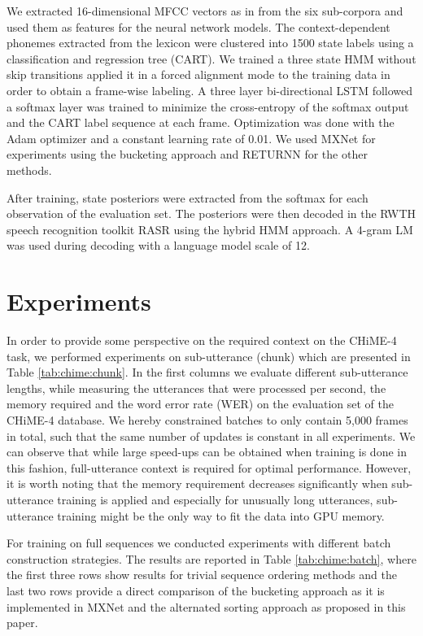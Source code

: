 \documentclass{article}
\begin{document}
  We extracted 16-dimensional MFCC vectors as in \cite{menne16:chime4System} from the six sub-corpora
  and used them as features for the neural network models. The context-dependent phonemes extracted from the lexicon were clustered into 
  1500 state labels using a classification and regression tree (CART).
  We trained a three state HMM without skip transitions applied it in a forced alignment mode to the training data in order to obtain a frame-wise labeling. A three layer 
  bi-directional LSTM followed a softmax layer was trained to minimize the cross-entropy of the softmax output and the CART label sequence at each frame. Optimization was done with the Adam optimizer and a constant learning rate of 0.01. We used MXNet \cite{mxnet} for experiments using the bucketing approach and RETURNN \cite{doetsch2017:returnn} for the other methods.  
  
  After training, state posteriors were extracted from the softmax for each observation of the evaluation set. The posteriors were then decoded in the RWTH 
  speech recognition toolkit RASR \cite{rybach2011:rasr} using the hybrid HMM approach. A 4-gram LM 
  was used during decoding with a language model scale of 12.

  \section{Experiments} \label{sec:experiments}
   In order to provide some perspective on the required context on the CHiME-4 task, 
   we performed experiments on sub-utterance (chunk) which are presented in 
   Table \ref{tab:chime:chunk}. In the first columns we evaluate different sub-utterance lengths, while measuring the utterances that were processed per second, the memory required and the word error rate (WER) on the evaluation set of the CHiME-4 database. We hereby constrained batches to only 
   contain 5,000 frames in total, such that the same number of updates is constant in all experiments. We can observe that 
   while large speed-ups can be obtained when training is done in this fashion, full-utterance context is
   required for optimal performance. However, it is worth noting that the memory requirement decreases 
   significantly when sub-utterance training is applied and especially for unusually long utterances, 
   sub-utterance training might be the only way to fit the data into GPU memory.
   
   For training on full sequences we conducted experiments with different batch construction strategies.
   The results are reported in Table \ref{tab:chime:batch}, where the first three rows show results for trivial sequence ordering 
   methods and the last two rows provide a direct comparison of the bucketing approach as 
   it is implemented in MXNet and the alternated sorting approach as proposed in this paper.
    
\end{document}
